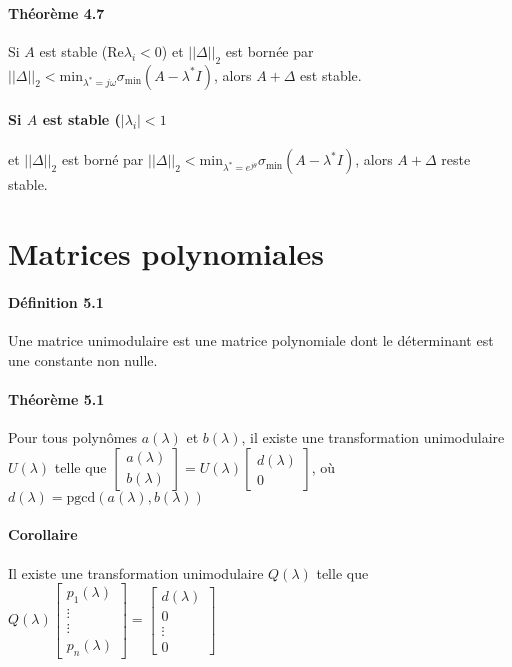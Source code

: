 \paragraph{Théorème 4.7} Si $A$ est stable (Re$\lambda_i < 0$) et $||\Delta||_2$ est bornée par $ ||\Delta||_2 < \text{min}_{\lambda^* = j\omega} \sigma_{\text{min}} (A-\lambda^*I)$, alors $A+\Delta$ est stable.

\paragraph{Si $A$ est stable ($|\lambda_i| < 1$} et $||\Delta||_2$ est borné par $||\Delta||_2 < \text{min}_{\lambda^* = e^{j\theta}} \sigma_{\text{min}} (A-\lambda^*I)$, alors $A+\Delta$ reste stable.

\section{Matrices polynomiales}

\paragraph{Définition 5.1} Une matrice unimodulaire est une matrice polynomiale dont le déterminant est une constante non nulle.

\paragraph{Théorème 5.1} Pour tous polynômes $a(\lambda)$ et $b(\lambda)$, il existe une transformation unimodulaire $U(\lambda)$ telle que $\begin{bmatrix}
a(\lambda) \\
b(\lambda)
\end{bmatrix}=U(\lambda)\begin{bmatrix}
d(\lambda) \\
0
\end{bmatrix}$, où $d(\lambda) = \text{pgcd}(a(\lambda),b(\lambda))$

\paragraph{Corollaire} Il existe une transformation unimodulaire $Q(\lambda)$ telle que $Q(\lambda)\begin{bmatrix}
p_1(\lambda) \\
\vdots \\
\vdots \\
p_n(\lambda)
\end{bmatrix} = \begin{bmatrix}
d(\lambda) \\
0 \\
\vdots \\
0
\end{bmatrix} $

